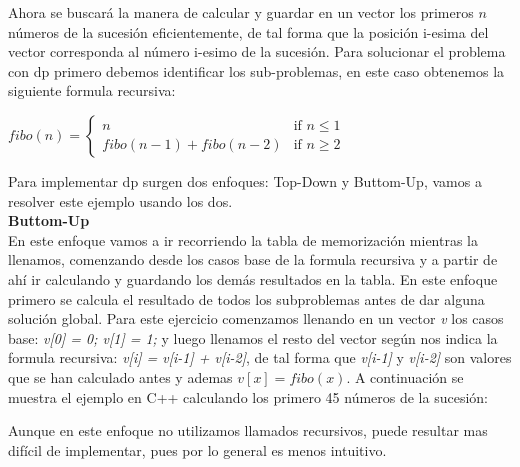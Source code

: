 \documentclass[12pt, a4paper]{article}
\newcommand\cppfile[2][]{

}
\begin{document}
	Ahora se buscará la manera de calcular y guardar en un vector los primeros $n$ números de la sucesión 
	eficientemente, de tal forma que la posición i-esima del vector corresponda al número i-esimo de la sucesión.
	Para solucionar el problema con dp primero debemos identificar los sub-problemas, en este caso obtenemos la 
	siguiente formula recursiva:\\
	\begin{center}
		$fibo(n) = 	
			\begin{cases}
				n & \text{if $n\le 1$}\\
				fibo(n-1) + fibo(n-2) & \text{if $n\ge 2$}
		\end{cases}	$\\
	\end{center}
	
	Para implementar dp surgen dos enfoques: Top-Down y Buttom-Up, vamos a resolver este ejemplo usando los dos.\\
	
	\textbf{Buttom-Up}\\
	En este enfoque vamos a ir recorriendo la tabla de memorización mientras la llenamos, comenzando desde los
	casos base de la formula recursiva y a partir de ahí ir calculando y guardando los demás resultados en la
	tabla. En este enfoque primero se calcula el resultado de todos los subproblemas antes de dar alguna solución 
	global. Para este ejercicio comenzamos llenando en un vector \textit{v} los casos
	base: \textit{v[0] = 0; v[1] = 1;} y luego llenamos el resto del vector según nos indica la formula
	recursiva: \textit{v[i] = v[i-1] + v[i-2]}, de tal forma que \textit{v[i-1]} y \textit{v[i-2]} son valores
	que se han calculado antes y ademas $v[x] = fibo(x)$. A continuación se muestra el ejemplo en C++ calculando
	los primero 45 números de la sucesión:
	\cppfile[5-12]{codigos/fibo.cpp}
	Aunque en este enfoque no utilizamos llamados recursivos, puede resultar mas difícil de implementar,
	pues por lo general es menos intuitivo.\\
	
\end{document}
